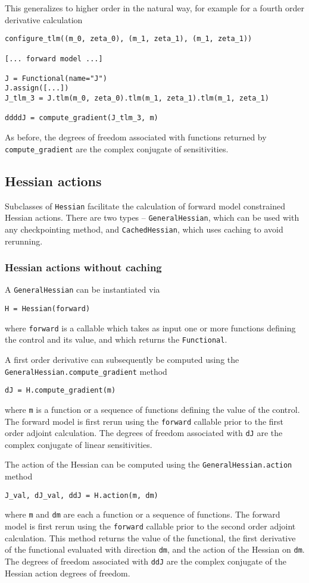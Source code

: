 \documentclass[11pt]{article}
\begin{document}
This generalizes to higher order in the natural way, for example for a fourth
order derivative calculation
\begin{lstlisting}
configure_tlm((m_0, zeta_0), (m_1, zeta_1), (m_1, zeta_1))

[... forward model ...]

J = Functional(name="J")
J.assign([...])
J_tlm_3 = J.tlm(m_0, zeta_0).tlm(m_1, zeta_1).tlm(m_1, zeta_1)

ddddJ = compute_gradient(J_tlm_3, m)
\end{lstlisting}

As before, the degrees of freedom associated with functions returned by
\texttt{compute\_gradient} are the complex conjugate of sensitivities.

\subsection{Hessian actions}\label{sect:Hessian}

Subclasses of \texttt{Hessian} facilitate the calculation of forward model
constrained Hessian actions. There are two types -- \texttt{GeneralHessian},
which can be used with any checkpointing method, and \texttt{CachedHessian},
which uses caching to avoid rerunning.

\subsubsection{Hessian actions without caching}

A \texttt{GeneralHessian} can be instantiated via
\begin{lstlisting}
H = Hessian(forward)
\end{lstlisting}
where \texttt{forward} is a callable which takes as input one or more functions
defining the control and its value, and which returns the \texttt{Functional}.

A first order derivative can subsequently be computed using the
\texttt{GeneralHessian.compute\_gradient} method
\begin{lstlisting}
dJ = H.compute_gradient(m)
\end{lstlisting}
where \texttt{m} is a function or a sequence of functions defining the value of
the control. The forward model is first rerun using the \texttt{forward}
callable prior to the first order adjoint calculation. The degrees of
freedom associated with \texttt{dJ} are the complex conjugate of linear
sensitivities.

The action of the Hessian can be computed using the
\texttt{GeneralHessian.action} method
\begin{lstlisting}
J_val, dJ_val, ddJ = H.action(m, dm)
\end{lstlisting}
where \texttt{m} and \texttt{dm} are each a function or a sequence of
functions. The forward model is first rerun using the \texttt{forward} callable
prior to the second order adjoint calculation. This method returns the value of
the functional, the first derivative of the functional evaluated with direction
\texttt{dm}, and the action of the Hessian on \texttt{dm}. The degrees of
freedom associated with \texttt{ddJ} are the complex conjugate of the Hessian
action degrees of freedom.
\end{document}

